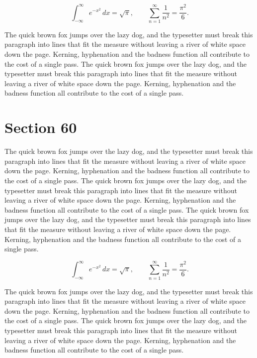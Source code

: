 \documentclass{article}
\begin{document}
\begin{equation}
\int_{-\infty}^{\infty} e^{-x^{2}}\,dx = \sqrt{\pi}, \qquad
\sum_{n=1}^{\infty} \frac{1}{n^{2}} = \frac{\pi^{2}}{6}.
\end{equation}

The quick brown fox jumps over the lazy dog, and the typesetter must break this paragraph into lines that fit the measure without leaving a river of white space down the page. Kerning, hyphenation and the badness function all contribute to the cost of a single pass. The quick brown fox jumps over the lazy dog, and the typesetter must break this paragraph into lines that fit the measure without leaving a river of white space down the page. Kerning, hyphenation and the badness function all contribute to the cost of a single pass. 
\section{Section 60}
The quick brown fox jumps over the lazy dog, and the typesetter must break this paragraph into lines that fit the measure without leaving a river of white space down the page. Kerning, hyphenation and the badness function all contribute to the cost of a single pass. The quick brown fox jumps over the lazy dog, and the typesetter must break this paragraph into lines that fit the measure without leaving a river of white space down the page. Kerning, hyphenation and the badness function all contribute to the cost of a single pass. The quick brown fox jumps over the lazy dog, and the typesetter must break this paragraph into lines that fit the measure without leaving a river of white space down the page. Kerning, hyphenation and the badness function all contribute to the cost of a single pass. 

\begin{equation}
\int_{-\infty}^{\infty} e^{-x^{2}}\,dx = \sqrt{\pi}, \qquad
\sum_{n=1}^{\infty} \frac{1}{n^{2}} = \frac{\pi^{2}}{6}.
\end{equation}

The quick brown fox jumps over the lazy dog, and the typesetter must break this paragraph into lines that fit the measure without leaving a river of white space down the page. Kerning, hyphenation and the badness function all contribute to the cost of a single pass. The quick brown fox jumps over the lazy dog, and the typesetter must break this paragraph into lines that fit the measure without leaving a river of white space down the page. Kerning, hyphenation and the badness function all contribute to the cost of a single pass. 
\end{document}
